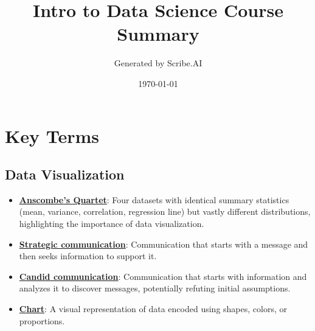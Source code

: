 \documentclass{article}%
\title{Intro to Data Science Course Summary}%
\author{Generated by Scribe.AI}%
\date{\today}%
\begin{document}
%
\normalsize%
\maketitle%
\section{Key Terms}%
\label{sec:KeyTerms}%
\subsection{Data Visualization}%
\label{subsec:DataVisualization}%
\begin{itemize}[leftmargin=*]%
\item \href{https://purdue.brightspace.com/d2l/common/assets/pdfjs-d2l-dist/1.0.14-legacy/web/viewer.html?file=\%2Fcontent\%2Fenforced\%2F1095465-WL.202510.CS24200.LE1\%2F09L1-IntroToVis.pdf\%3Fou\%3D1095465\&lang=en-us\&container=d2l-fileviewer-rendered-pdf\&fullscreen=d2l-fileviewer-rendered-pdf-dialog\&height=667#page=6}{\textbf{Anscombe's Quartet}}: Four datasets with identical summary statistics (mean, variance, correlation, regression line) but vastly different distributions, highlighting the importance of data visualization.%
\item \href{https://purdue.brightspace.com/d2l/common/assets/pdfjs-d2l-dist/1.0.14-legacy/web/viewer.html?file=\%2Fcontent\%2Fenforced\%2F1095465-WL.202510.CS24200.LE1\%2F09L1-IntroToVis.pdf\%3Fou\%3D1095465\&lang=en-us\&container=d2l-fileviewer-rendered-pdf\&fullscreen=d2l-fileviewer-rendered-pdf-dialog\&height=667#page=4}{\textbf{Strategic communication}}: Communication that starts with a message and then seeks information to support it.%
\item \href{https://purdue.brightspace.com/d2l/common/assets/pdfjs-d2l-dist/1.0.14-legacy/web/viewer.html?file=\%2Fcontent\%2Fenforced\%2F1095465-WL.202510.CS24200.LE1\%2F09L1-IntroToVis.pdf\%3Fou\%3D1095465\&lang=en-us\&container=d2l-fileviewer-rendered-pdf\&fullscreen=d2l-fileviewer-rendered-pdf-dialog\&height=667#page=4}{\textbf{Candid communication}}: Communication that starts with information and analyzes it to discover messages, potentially refuting initial assumptions.%
\item \href{https://purdue.brightspace.com/d2l/common/assets/pdfjs-d2l-dist/1.0.14-legacy/web/viewer.html?file=\%2Fcontent\%2Fenforced\%2F1095465-WL.202510.CS24200.LE1\%2F09L1-IntroToVis.pdf\%3Fou\%3D1095465\&lang=en-us\&container=d2l-fileviewer-rendered-pdf\&fullscreen=d2l-fileviewer-rendered-pdf-dialog\&height=667#page=5}{\textbf{Chart}}: A visual representation of data encoded using shapes, colors, or proportions.%

\end{itemize}
\end{document}
